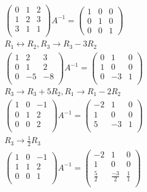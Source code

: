 \documentclass{article}
\begin{document}
\begin{gather*}
\begin{pmatrix}
0 & 1 & 2\\
1 & 2 & 3\\
3 & 1 & 1\\
\end{pmatrix}A^{-1} = \begin{pmatrix}
1 & 0 & 0\\
0 & 1 & 0\\
0 & 0 & 1
\end{pmatrix}\\
R_1 \leftrightarrow R_2 , R_3 \rightarrow R_3 - 3R_2\\
\begin{pmatrix}
1 & 2 & 3\\ 
0 & 1 & 2\\
0 & -5 & -8\\
\end{pmatrix} A^{-1} = \begin{pmatrix}
0 & 1 & 0\\
1 & 0 & 0\\
0 & -3 & 1 \\
\end{pmatrix}\\
R_3 \rightarrow R_3 + 5R_2, R_1 \rightarrow R_1 - 2R_2\\
\begin{pmatrix}
1 & 0 & -1\\
0 & 1 & 2\\
0 & 0 & 2\\
\end{pmatrix} A^{-1} = \begin{pmatrix}
-2 & 1 & 0\\
1 & 0 & 0 \\
5 & -3 & 1\\
\end{pmatrix}\\
R_3 \rightarrow \frac{1}{2} R_3\\
\begin{pmatrix}
1 & 0 & -1\\
1 & 1 & 2\\
0 & 0 & 1\\
\end{pmatrix} A^{-1} = \begin{pmatrix}
-2 & 1 & 0 \\
1 & 0 & 0 \\
\frac{5}{2} & \frac{-3}{2} & \frac{1}{1}\\
\end{pmatrix}\\
\end{gather*}
\end{document}
